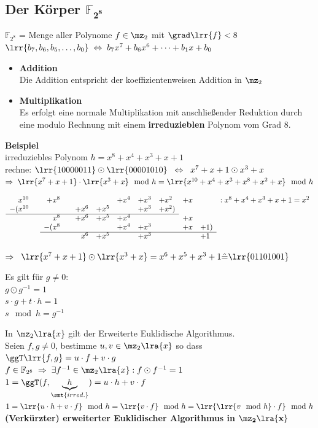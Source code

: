 	\subsection{Der Körper \texorpdfstring{$\mathbf{\mathbb{F}_{2^8}}$}{F}}
		$\mathbb{F}_{2^8}$ = Menge aller Polynome $f\in\mz_2$ mit $\grad\lrr{f}<8$\\
		$\lrr{b_7,b_6,b_5,\dots,b_0}\;\Leftrightarrow\;b_7x^7+b_6x^6+\dots+b_1x+b_0$
	
		\begin{itemize}
			\item \textbf{Addition}\\
				Die Addition entspricht der koeffizientenweisen Addition in $\mz_2$
			\item \textbf{Multiplikation}\\
				Es erfolgt eine normale Multiplikation mit anschließender Reduktion durch eine modulo Rechnung mit einem \textbf{irreduzieblen} Polynom vom Grad $8$.
		\end{itemize}
	
		\textbf{Beispiel}\\
		irreduziebles Polynom $h=x^8+x^4+x^3+x+1$\\
		rechne: $\lrr{10000011}\odot\lrr{00001010}\;\;\Leftrightarrow\;\;x^7+x+1\odot x^3+x$\\
		$\Rightarrow\;\lrr{x^7+x+1}\cdot\lrr{x^3+x}\mod h=\lrr{x^{10}+x^4+x^3+x^8+x^2+x}\mod h$
			
		$\begin{array}{rrrrrrrrlrlr}
			x^{10}	&	&	+x^8		&	&		&		&	+x^4	&	+x^3	&	+x^2		&+x	&	&: x^8+x^4+x^3+x+1=x^2	\\
			-(x^{10}&	&			&	&	+x^6	&	+x^5	&		&	+x^3	&	+x^2)	&	&	&						\\ \cline{1-9}
					&	&	x^8		&	&	+x^6	&	+x^5	&	+x^4	&		&			&+x	&	&						\\
					&	&	-(x^8	&	&		&		&	+x^4	&	+x^3	&			&+x	&+1)	&						\\ \cline{3-11}
					&	&			&	&	x^6	&	+x^5	&		&	+x^3	&			&	&+1	& 
		\end{array}$
			
		$\Rightarrow\;\;\lrr{x^7+x+1}\odot\lrr{x^3+x} = x^6+x^5+x^3+1\hat{=}\lrr{01101001}$
	
		Es gilt für $g\neq 0$:\\
		$g\odot g^{-1} =1$\\
		$s\cdot g + t\cdot h=1$\\
		$s\mod h = g^{-1}$
	
		In $\mz_2\lra{x}$ gilt der Erweiterte Euklidische Algorithmus.\\
		Seien $f,g\neq 0$, bestimme $u,v\in\mz_2\lra{x}$ so dass $\ggT\lrr{f,g}=u\cdot f+v\cdot g$\\
		$f\in\mathbb{F}_{2^8}\;\Rightarrow\;\exists f^{-1}\in\mz_2\lra{x}:f\odot f^{-1}=1$\\
		$1=\ggT(f,\underbrace{h}_{\smt{irred.}}) = u\cdot h+v\cdot f$\\
		$1=\lrr{u\cdot h+v\cdot f}\mod h=\lrr{v\cdot f}\mod h=\lrr{\lrr{v\mod h}\cdot f}\mod h$
\newpage	
		\textbf{(Verkürzter) erweiterter Euklidischer Algorithmus in }$\mathbf{\mz_2\lra{x}}$
		
